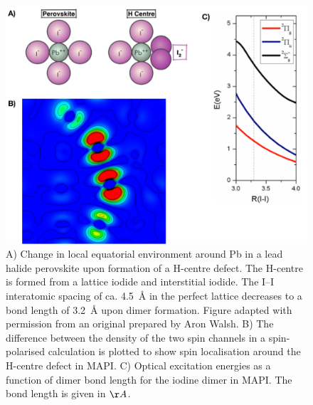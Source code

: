 \begin{figure}[h!]   %
\centering
  \includegraphics[width=0.9\columnwidth]{figures/ch6/spin_localisation.png}
  \caption[H-centre spin localisation and optical excitation energies]{A) Change in local equatorial environment around Pb in a lead halide perovskite upon formation of a H-centre defect. The H-centre is formed from a lattice iodide and interstitial iodide. The I--I interatomic spacing of ca. \SI{4.5}{\angstrom} in the perfect lattice decreases to a bond length of \SI{3.2}{\angstrom} upon dimer formation. Figure adapted with permission from an original prepared by Aron Walsh. B)  The difference between the density of the two spin channels in a spin-polarised calculation is plotted to show spin localisation around the H-centre defect in MAPI. C) Optical excitation energies as a function of dimer bond length for the iodine dimer in MAPI. The bond length is given in $\AA$.}
\label{spin_localisation}
\end{figure}

